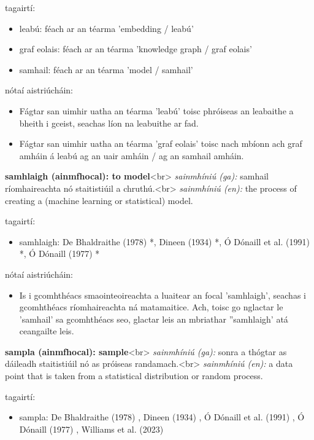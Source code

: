 \documentclass{article}
\begin{document}
tagairtí:
\begin{itemize}
	\item leabú: féach ar an téarma 'embedding / leabú'
	\item graf eolais: féach ar an téarma 'knowledge graph / graf eolais'
	\item samhail: féach ar an téarma 'model / samhail'
\end{itemize}

nótaí aistriúcháin:
\begin{itemize}
	\item Fágtar san uimhir uatha an téarma 'leabú' toisc phróiseas an leabaithe a bheith i gceist, seachas líon na leabuithe ar fad.
	\item Fágtar san uimhir uatha an téarma 'graf eolais' toisc nach mbíonn ach graf amháin á leabú ag an uair amháin / ag an samhail amháin.
\end{itemize}


\textbf{samhlaigh (ainmfhocal): to model}<br>
\textit{sainmhíniú (ga):} samhail ríomhaireachta nó staitistiúil a chruthú.<br>
\textit{sainmhíniú (en):} the process of creating a (machine learning or statistical) model.

tagairtí:
\begin{itemize}
	\item samhlaigh: De Bhaldraithe (1978) \cite{de-bhaldraithe}*, Dineen (1934) \cite{dineen}*, Ó Dónaill et al. (1991) \cite{focloir-beag}*, Ó Dónaill (1977) \cite{odonaill}*
\end{itemize}

nótaí aistriúcháin:
\begin{itemize}
	\item Is i gcomhthéacs smaointeoireachta a luaitear an focal 'samhlaigh', seachas i gcomhthéacs ríomhaireachta ná matamaitice. Ach, toisc go nglactar le 'samhail' sa gcomhthéacs seo, glactar leis an mbriathar ''samhlaigh' atá ceangailte leis.
\end{itemize}


\textbf{sampla (ainmfhocal): sample}<br>
\textit{sainmhíniú (ga):} sonra a thógtar as dáileadh staitistiúil nó as próiseas randamach.<br>
\textit{sainmhíniú (en):} a data point that is taken from a statistical distribution or random process.

tagairtí:
\begin{itemize}
	\item sampla: De Bhaldraithe (1978) \cite{de-bhaldraithe}, Dineen (1934) \cite{dineen}, Ó Dónaill et al. (1991) \cite{focloir-beag}, Ó Dónaill (1977) \cite{odonaill}, Williams et al. (2023) \cite{storchiste}
\end{itemize}
\end{document}
